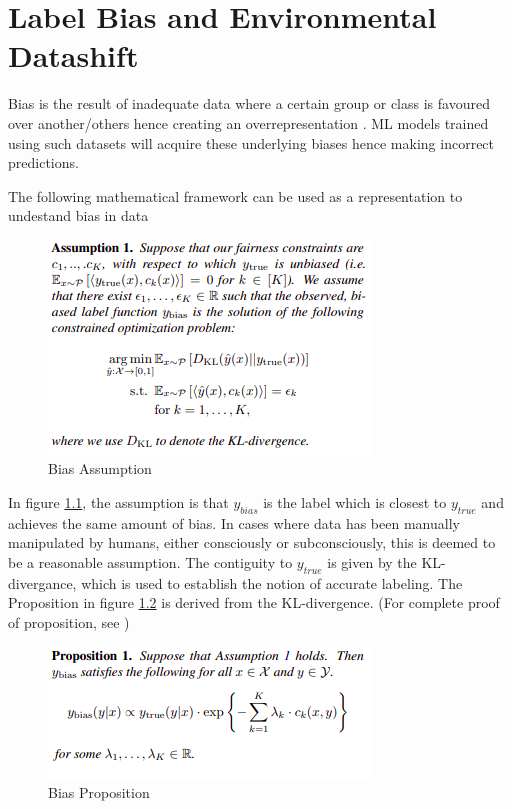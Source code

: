\documentclass[a4paper,12pt]{report}
\begin{document}
\chapter{Label Bias and Environmental Datashift}
Bias is the result of inadequate data where a certain group or class is favoured over another/others hence creating an overrepresentation \cite{Jiang}\cite{saria2019tutorial}.
ML models trained using such datasets will acquire these underlying biases hence making incorrect predictions.

The following mathematical framework can be used as a representation to undestand bias in data \cite{Jiang}

\begin{figure}[h]
    \includegraphics[scale =0.8]{Assumption.png}
    \centering
    \caption{Bias Assumption \cite{Jiang}}
    \label{fig:Assumption}
\end{figure}

In figure \ref{fig:Assumption}, the assumption is that $y_{bias}$ is the label which is closest to $y_{true}$ and achieves the same amount of bias.
In cases where data has been manually manipulated by humans, either consciously or subconsciously, this is deemed to be a reasonable assumption.
The contiguity to $y_{true}$ is given by the KL-divergance, which is used to establish the notion of accurate labeling. 
The Proposition in figure \ref{fig:Proposition} is derived from the KL-divergence. (For complete proof of proposition, see \cite{Jiang})

\begin{figure}[h]
    \includegraphics[scale =0.8]{Prop.png}
    \centering
    \caption{Bias Proposition \cite{Jiang}}
    \label{fig:Proposition}
\end{figure}
\end{document}
